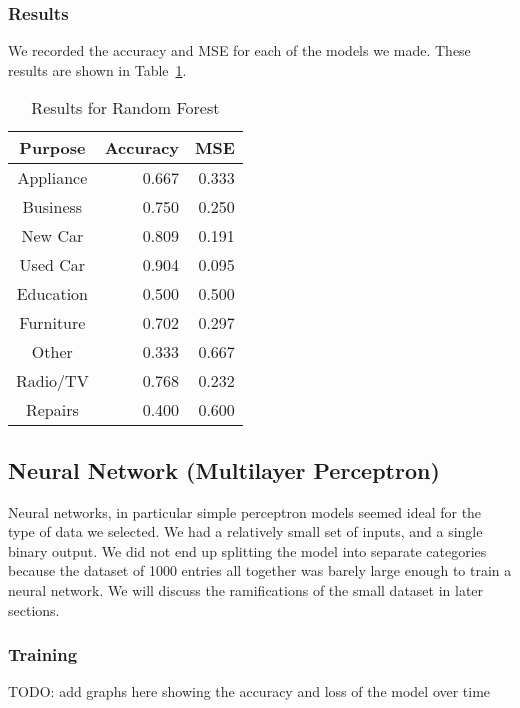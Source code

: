 \documentclass[12pt,twocolumn]{article}
\begin{document}
\subsubsection{Results}

We recorded the accuracy and MSE for each of the models we made. These results are shown in Table~\ref{tab:random_forest_results}.


\begin{table}
    \centering
    \begin{tabular}{|c|r|r|}
        \hline
        Purpose & Accuracy & MSE \\
        \hline
        \hline
        Appliance & 0.667 & 0.333 \\
        \hline
        Business & 0.750 & 0.250 \\
        \hline
        New Car & 0.809 & 0.191 \\
        \hline
        Used Car & 0.904 & 0.095 \\
        \hline
        Education & 0.500 & 0.500 \\
        \hline
        Furniture & 0.702 & 0.297 \\
        \hline
        Other & 0.333 & 0.667 \\
        \hline
        Radio/TV & 0.768 & 0.232 \\
        \hline
        Repairs & 0.400 & 0.600 \\
        \hline
    \end{tabular}
    \caption{Results for Random Forest}\label{tab:random_forest_results}
\end{table}


\subsection{Neural Network (Multilayer Perceptron)}
Neural networks, in particular simple perceptron models seemed ideal for the type of data we selected. We had a relatively small set of inputs, and a single binary output. We did not end up splitting the model into separate categories because the dataset of 1000 entries all together was barely large enough to train a neural network. We will discuss the ramifications of the small dataset in later sections.

\subsubsection{Training}
TODO: add graphs here showing the accuracy and loss of the model over time
\end{document}
